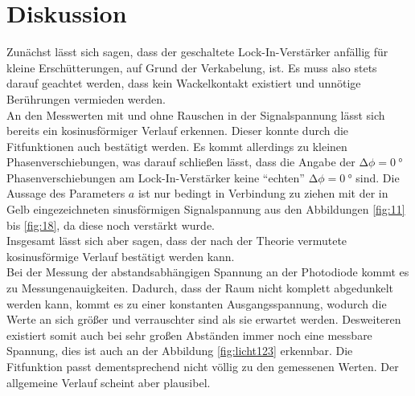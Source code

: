 \section{Diskussion}

Zunächst lässt sich sagen, dass der geschaltete Lock-In-Verstärker anfällig für kleine Erschütterungen, auf Grund der Verkabelung, ist.
Es muss also stets darauf geachtet werden, dass kein Wackelkontakt existiert und unnötige Berührungen vermieden werden.
\\
\newline
An den Messwerten mit und ohne Rauschen in der Signalspannung lässt sich bereits ein kosinusförmiger Verlauf erkennen. Dieser konnte
durch die Fitfunktionen auch bestätigt werden. Es kommt allerdings zu kleinen Phasenverschiebungen, was darauf schließen lässt, dass die Angabe der $\increment \phi = \SI{0}{\degree}$ Phasenverschiebungen am
Lock-In-Verstärker keine \enquote{echten} $\increment \phi = \SI{0}{\degree}$ sind. Die Aussage des Parameters $a$ ist nur bedingt in Verbindung zu ziehen mit der in Gelb eingezeichneten
sinusförmigen Signalspannung aus den Abbildungen \ref{fig:11} bis \ref{fig:18}, da diese noch verstärkt wurde.
\\
Insgesamt lässt sich aber sagen, dass der nach der Theorie vermutete kosinusförmige Verlauf bestätigt werden kann.
\\
\newline
Bei der Messung der abstandsabhängigen Spannung an der Photodiode kommt es zu Messungenauigkeiten. Dadurch, dass der Raum nicht
komplett abgedunkelt werden kann, kommt es zu einer konstanten Ausgangsspannung, wodurch die Werte an sich größer und verrauschter sind als sie erwartet werden. Desweiteren 
existiert somit auch bei sehr großen Abständen immer noch eine messbare Spannung, dies ist auch an der Abbildung \ref{fig:licht123} erkennbar. Die Fitfunktion passt 
dementsprechend nicht völlig zu den gemessenen Werten. Der allgemeine Verlauf scheint aber plausibel.